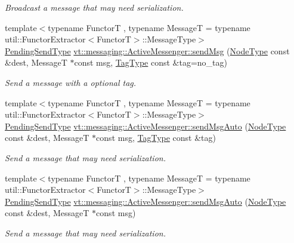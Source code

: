 \begin{DoxyCompactItemize}
\begin{DoxyCompactList}\small\item\em Broadcast a message that may need serialization. \end{DoxyCompactList}\item 
{\footnotesize template$<$typename FunctorT , typename MessageT  = typename util\+::\+Functor\+Extractor$<$\+Functor\+T$>$\+::\+Message\+Type$>$ }\\\hyperlink{structvt_1_1messaging_1_1_active_messenger_a3626a6ca76d8ad4ec7c3b47a2c70d3a8}{Pending\+Send\+Type} \hyperlink{group__functorsend_ga13e2d0b763ed5baac91fb86472d39f5e}{vt\+::messaging\+::\+Active\+Messenger\+::send\+Msg} (\hyperlink{namespacevt_a866da9d0efc19c0a1ce79e9e492f47e2}{Node\+Type} const \&dest, MessageT $\ast$const msg, \hyperlink{namespacevt_a84ab281dae04a52a4b243d6bf62d0e52}{Tag\+Type} const \&tag=no\+\_\+tag)
\begin{DoxyCompactList}\small\item\em Send a message with a optional tag. \end{DoxyCompactList}\item 
{\footnotesize template$<$typename FunctorT , typename MessageT  = typename util\+::\+Functor\+Extractor$<$\+Functor\+T$>$\+::\+Message\+Type$>$ }\\\hyperlink{structvt_1_1messaging_1_1_active_messenger_a3626a6ca76d8ad4ec7c3b47a2c70d3a8}{Pending\+Send\+Type} \hyperlink{group__functorsend_ga0b627679790c568af6e18132d7ace06b}{vt\+::messaging\+::\+Active\+Messenger\+::send\+Msg\+Auto} (\hyperlink{namespacevt_a866da9d0efc19c0a1ce79e9e492f47e2}{Node\+Type} const \&dest, MessageT $\ast$const msg, \hyperlink{namespacevt_a84ab281dae04a52a4b243d6bf62d0e52}{Tag\+Type} const \&tag)
\begin{DoxyCompactList}\small\item\em Send a message that may need serialization. \end{DoxyCompactList}\item 
{\footnotesize template$<$typename FunctorT , typename MessageT  = typename util\+::\+Functor\+Extractor$<$\+Functor\+T$>$\+::\+Message\+Type$>$ }\\\hyperlink{structvt_1_1messaging_1_1_active_messenger_a3626a6ca76d8ad4ec7c3b47a2c70d3a8}{Pending\+Send\+Type} \hyperlink{group__functorsend_ga12dd37753bdb2a09b5e3e2a40aa31868}{vt\+::messaging\+::\+Active\+Messenger\+::send\+Msg\+Auto} (\hyperlink{namespacevt_a866da9d0efc19c0a1ce79e9e492f47e2}{Node\+Type} const \&dest, MessageT $\ast$const msg)
\begin{DoxyCompactList}\small\item\em Send a message that may need serialization. \end{DoxyCompactList}\end{DoxyCompactItemize}


